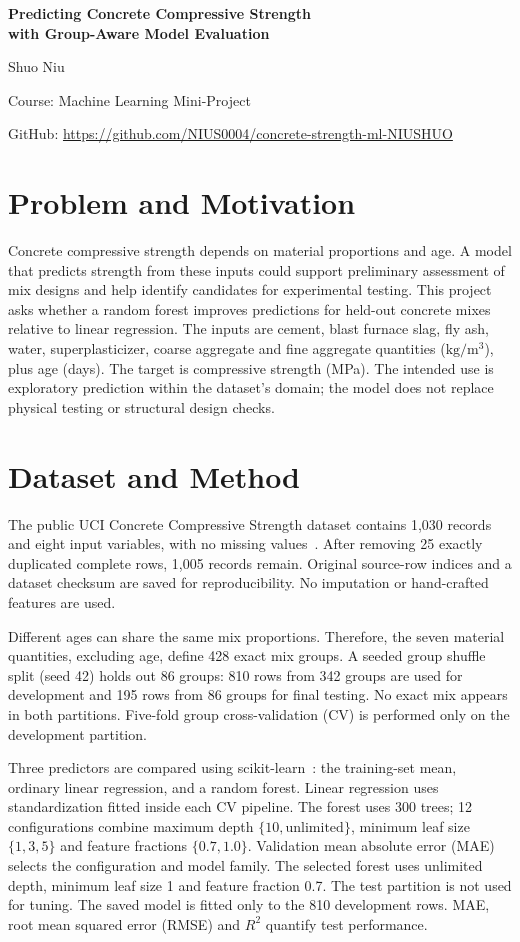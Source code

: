 \documentclass[10pt,a4paper]{article}
\newcommand{\repo}{\url{https://github.com/NIUS0004/concrete-strength-ml-NIUSHUO}}
\begin{document}
\begin{center}
{\Large\bfseries Predicting Concrete Compressive Strength\\with Group-Aware Model Evaluation}\par
\vspace{4pt}
Shuo Niu\par
Course: Machine Learning Mini-Project\par
{\small GitHub: \repo}
\end{center}
\vspace{-8pt}

\section{Problem and Motivation}
Concrete compressive strength depends on material proportions and age. A model
that predicts strength from these inputs could support preliminary assessment of
mix designs and help identify candidates for experimental testing. This project
asks whether a random forest improves predictions for held-out concrete mixes
relative to linear regression. The inputs are cement, blast furnace slag, fly ash,
water, superplasticizer, coarse aggregate and fine aggregate quantities
($\mathrm{kg/m^3}$), plus age (days). The target is compressive strength (MPa).
The intended use is exploratory prediction within the dataset's domain; the
model does not replace physical testing or structural design checks.

\section{Dataset and Method}
The public UCI Concrete Compressive Strength dataset contains 1,030 records and
eight input variables, with no missing values~\cite{uci}. After removing 25
exactly duplicated complete rows, 1,005 records remain. Original source-row
indices and a dataset checksum are saved for reproducibility. No imputation or
hand-crafted features are used.

Different ages can share the same mix proportions. Therefore, the seven material
quantities, excluding age, define 428 exact mix groups. A seeded group shuffle
split (seed 42) holds out 86 groups: 810 rows from 342 groups are used for
development and 195 rows from 86 groups for final testing. No exact mix appears
in both partitions. Five-fold group cross-validation (CV) is performed only on
the development partition.

Three predictors are compared using scikit-learn~\cite{sklearn}: the training-set
mean, ordinary linear regression, and a random forest. Linear regression uses
standardization fitted inside each CV pipeline. The forest uses 300 trees;
12 configurations combine maximum depth $\{10,\mathrm{unlimited}\}$, minimum
leaf size $\{1,3,5\}$ and feature fractions $\{0.7,1.0\}$. Validation mean absolute
error (MAE) selects the configuration and model family. The selected forest uses
unlimited depth, minimum leaf size 1 and feature fraction 0.7. The test partition
is not used for tuning. The saved model is fitted only to the 810 development
rows. MAE, root mean squared error (RMSE) and $R^2$ quantify test performance.
\end{document}
